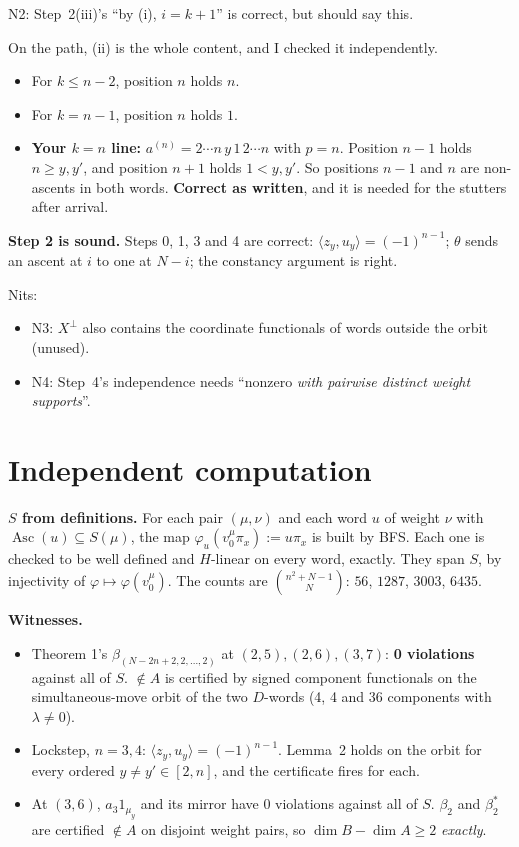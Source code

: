 \documentclass[11pt]{article}
\newcommand{\Asc}{\operatorname{Asc}}
\begin{document}
N2: Step~2(iii)'s ``by (i), $i=k+1$'' is correct, but should say this.

On the path, (ii) is the whole content, and I checked it independently.
\begin{itemize}[nosep]
\item For $k\le n-2$, position $n$ holds $n$.
\item For $k=n-1$, position $n$ holds $1$.
\item \textbf{Your $k=n$ line:} $a^{(n)}=2\cdots n\,y\,1\,2\cdots n$ with $p=n$. Position $n-1$ holds $n\ge y,y'$, and position $n+1$ holds $1<y,y'$. So positions $n-1$ and $n$ are non-ascents in both words. \textbf{Correct as written}, and it is needed for the stutters after arrival.
\end{itemize}
\textbf{Step 2 is sound.} Steps 0, 1, 3 and 4 are correct: $\langle z_y,u_y\rangle=(-1)^{n-1}$; $\theta$ sends an ascent at $i$ to one at $N-i$; the constancy argument is right.

Nits:
\begin{itemize}[nosep]
\item N3: $X^\perp$ also contains the coordinate functionals of words outside the orbit (unused).
\item N4: Step~4's independence needs ``nonzero \emph{with pairwise distinct weight supports}''.
\end{itemize}

\section{Independent computation}
\textbf{$S$ from definitions.} For each pair $(\mu,\nu)$ and each word $u$ of weight $\nu$ with $\Asc(u)\subseteq S(\mu)$, the map $\varphi_u(v_0^\mu\pi_x):=u\pi_x$ is built by BFS. Each one is checked to be well defined and $H$-linear on every word, exactly. They span $S$, by injectivity of $\varphi\mapsto\varphi(v_0^\mu)$. The counts are $\binom{n^2+N-1}{N}$: $56$, $1287$, $3003$, $6435$.

\textbf{Witnesses.}
\begin{itemize}[nosep]
\item Theorem 1's $\beta_{(N-2n+2,2,\dots,2)}$ at $(2,5),(2,6),(3,7)$: \textbf{0 violations} against all of $S$. $\notin A$ is certified by signed component functionals on the simultaneous-move orbit of the two $D$-words (4, 4 and 36 components with $\lambda\ne0$).
\item Lockstep, $n=3,4$: $\langle z_y,u_y\rangle=(-1)^{n-1}$. Lemma~2 holds on the orbit for every ordered $y\ne y'\in[2,n]$, and the certificate fires for each.
\item At $(3,6)$, $a_3 1_{\mu_y}$ and its mirror have 0 violations against all of $S$. $\beta_2$ and $\beta_2^*$ are certified $\notin A$ on disjoint weight pairs, so $\dim B-\dim A\ge2$ \emph{exactly}.
\end{itemize}
\end{document}
